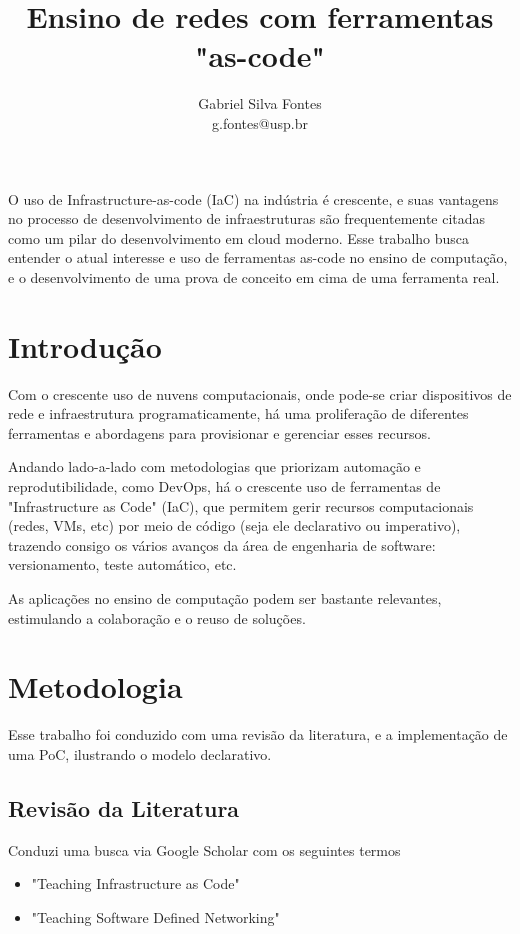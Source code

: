 \documentclass[12pt]{article}
\title{Ensino de redes com ferramentas "as-code"}
\author{Gabriel Silva Fontes\inst{1} \\ g.fontes@usp.br}
\begin{document}
\maketitle

\begin{resumo}
    O uso de Infrastructure-as-code (IaC) na indústria é crescente, e suas vantagens no processo de desenvolvimento de infraestruturas são frequentemente citadas como um pilar do desenvolvimento em cloud moderno. Esse trabalho busca entender o atual interesse e uso de ferramentas as-code no ensino de computação, e o desenvolvimento de uma prova de conceito em cima de uma ferramenta real.
\end{resumo}

\section{Introdução}

Com o crescente uso de nuvens computacionais, onde pode-se criar dispositivos
de rede e infraestrutura programaticamente, há uma proliferação de diferentes
ferramentas e abordagens para provisionar e gerenciar esses recursos.

Andando lado-a-lado com metodologias que priorizam automação e
reprodutibilidade, como DevOps, há o crescente uso de ferramentas de
"Infrastructure as Code" (IaC), que permitem gerir recursos computacionais
(redes, VMs, etc) por meio de código (seja ele declarativo ou imperativo),
trazendo consigo os vários avanços da área de engenharia de software:
versionamento, teste automático, etc.

As aplicações no ensino de computação podem ser bastante relevantes,
estimulando a colaboração e o reuso de soluções.

\section{Metodologia}

Esse trabalho foi conduzido com uma revisão da literatura, e a implementação de
uma PoC, ilustrando o modelo declarativo.

\subsection{Revisão da Literatura}

Conduzi uma busca via Google Scholar com os seguintes termos

\begin{itemize}
    \item "Teaching Infrastructure as Code"
    \item "Teaching Software Defined Networking"
\end{itemize}
\end{document}
